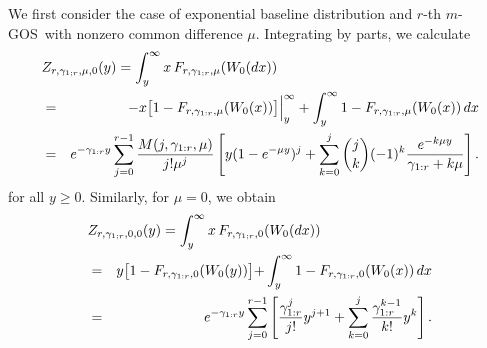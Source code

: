 \documentclass [11pt]{article}
\newcommand{\gos}{GOS}
\begin{document}
We first consider the case of exponential baseline distribution and $r$-th $m$-\gos\ with nonzero common difference $\mu$.
Integrating by parts, we calculate 
\begin{eqnarray}
\lefteqn{Z_{r,\gamma_{1;r}, \mu,0}(y) =
\int_y^\infty x \,F_{r,\gamma_{1;r}, \mu} (W_0 (dx)) }
\nonumber \\
& = &
 - x \bigl[1-F_{r,\gamma_{1:r}, \mu}(W_0(x))\bigr] \Bigr|_y^\infty
+ \int_y^\infty 1-F_{r,\gamma_{1:r}, \mu}(W_0(x))\,dx \nonumber \\
& = & e^{-\gamma_{1:r}y}\sum_{j=0}^{r-1}
\frac{M(j,\gamma_{1:r},\mu)}{j!\mu^j}
\left[y (1-e^{-\mu y})^j +
\sum_{k=0}^j {j \choose k} (-1)^k
\frac{e^{-k\mu y}}{\gamma_{1:r}+k\mu}\right]. \nonumber
\label{25b}
\end{eqnarray}
for all $y \geq 0$.
Similarly, for $\mu=0$, we obtain
\begin{eqnarray}
\lefteqn{Z_{r,\gamma_{1;r}, 0,0}(y) =
\int_y^\infty x \,F_{r,\gamma_{1;r}, 0} (W_0 (dx)) }
\nonumber \\ & = &
y \bigr[1-F_{r,\gamma_{1:r}, 0}(W_0(y))\bigl]
+ \int_y^\infty 1-F_{r,\gamma_{1:r}, 0}(W_0(x))\,dx \nonumber \\
& = & e^{-\gamma_{1:r}y}
\sum_{j=0}^{r-1}
\left[\frac{\gamma^j_{1:r}}{j!} y^{j+1}
+  \sum_{k=0}^j \frac{\gamma_{1:r}^{k-1}}{k!} y^k
\right] . \nonumber
\label{25c}
\end{eqnarray}
\end{document}
